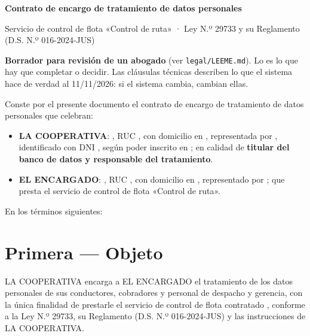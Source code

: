 \documentclass[10.5pt,a4paper]{article}
\begin{document}

{\LARGE\bfseries Contrato de encargo de tratamiento de datos personales}\par
{\small\color{tenue}Servicio de control de flota «Control de ruta» · Ley N.º 29733 y su Reglamento (D.S. N.º 016-2024-JUS)}

\begin{borrador}
\textbf{Borrador para revisión de un abogado} (ver \texttt{legal/LEEME.md}).
Lo  es lo que hay que completar o decidir.
Las cláusulas técnicas describen lo que el sistema hace de verdad al 11/11/2026:
si el sistema cambia, cambian ellas.
\end{borrador}

Conste por el presente documento el contrato de encargo de tratamiento de
datos personales que celebran:

\begin{itemize}[leftmargin=14pt]
\item \textbf{LA COOPERATIVA}: \llenar[6.5cm], RUC \llenar[3cm],\newline
  con domicilio en \llenar[5.4cm], representada por \llenar[4.6cm],\newline
  identificado con DNI \llenar[2.6cm], según poder inscrito en \llenar[4.4cm];\newline
  en calidad de \textbf{titular del banco de datos y responsable del
  tratamiento}.
\item \textbf{EL ENCARGADO}: \llenar[6.8cm], RUC \llenar[3cm],\newline
  con domicilio en \llenar[5.4cm], representado por \llenar[4.6cm];\newline
  que presta el servicio de control de flota «Control de ruta».
\end{itemize}
En los términos siguientes:

\section{Primera — Objeto}
LA COOPERATIVA encarga a EL ENCARGADO el tratamiento de los datos personales
de sus conductores, cobradores y personal de despacho y gerencia, con la única
finalidad de prestarle el servicio de control de flota contratado
, conforme a la Ley N.º 29733,
su Reglamento (D.S. N.º 016-2024-JUS) y las instrucciones de LA COOPERATIVA.
\end{document}
